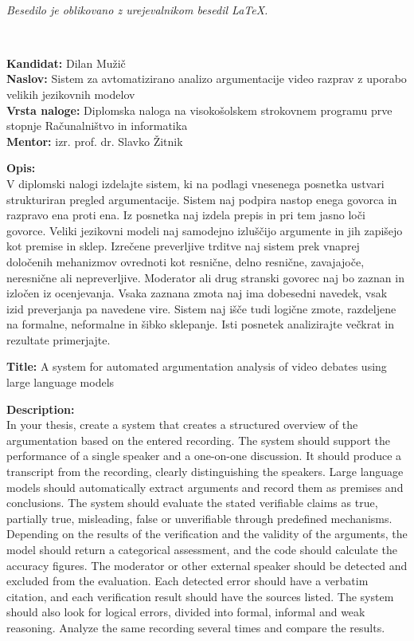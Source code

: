 \documentclass[a4paper, 12pt]{book}
\newcommand{\ttitle}{Sistem za avtomatizirano analizo argumentacije video razprav z uporabo velikih jezikovnih modelov}
\newcommand{\ttitleEn}{A system for automated argumentation analysis of video debates using large language models}
\newcommand{\tauthor}{Dilan Mužič}
\newcommand{\tmentor}{izr. prof. dr. Slavko Žitnik}
\newcommand{\clearemptydoublepage}{\newpage{\pagestyle{empty}\cleardoublepage}}
\begin{document}
\vfill
\begin{center}
  \ \\ \vfill
  {\em
  Besedilo je oblikovano z urejevalnikom besedil \LaTeX.}
\end{center}

\clearemptydoublepage

\thispagestyle{empty}
\
\vfill

\bigskip
\noindent\textbf{Kandidat:} \tauthor\\
\noindent\textbf{Naslov:} \ttitle\\
\noindent\textbf{Vrsta naloge:} Diplomska naloga na visokošolskem strokovnem programu prve stopnje Računalništvo in informatika \\
\noindent\textbf{Mentor:} \tmentor

\bigskip
\noindent\textbf{Opis:}\\
\hspace{1em}V diplomski nalogi izdelajte sistem, ki na podlagi vnesenega posnetka ustvari strukturiran pregled argumentacije. Sistem naj podpira nastop enega govorca in razpravo ena proti ena. Iz posnetka naj izdela prepis in pri tem jasno loči govorce. Veliki jezikovni modeli naj samodejno izluščijo argumente in jih zapišejo kot premise in sklep. Izrečene preverljive trditve naj sistem prek vnaprej določenih mehanizmov ovrednoti kot resnične, delno
resnične, zavajajoče, neresnične ali nepreverljive. Moderator ali drug stranski govorec naj bo zaznan in izločen iz ocenjevanja. Vsaka zaznana zmota naj ima dobesedni navedek, vsak izid preverjanja pa navedene vire. Sistem naj išče tudi logične zmote, razdeljene na formalne, neformalne in šibko sklepanje. Isti posnetek analizirajte večkrat in rezultate primerjajte.

\bigskip
\noindent\textbf{Title:} \ttitleEn

\bigskip
\noindent\textbf{Description:}\\
In your thesis, create a system that creates a structured overview of the argumentation based on the entered recording. The system should support the performance of a single speaker and a one-on-one discussion. It should produce a transcript from the recording, clearly distinguishing the speakers. Large language models should automatically extract arguments and record them as premises and conclusions. The system should evaluate the stated verifiable claims as true, partially true, misleading, false or unverifiable through predefined mechanisms. Depending on the results of the verification and the validity of the arguments, the model should return a categorical assessment, and the code should calculate the accuracy figures. The moderator or other external speaker should be detected and excluded from the evaluation. Each detected error should have a verbatim citation, and each verification result should have the sources listed. The system should also look for logical errors, divided into formal, informal and weak reasoning. Analyze the same recording several times and compare the results.
\end{document}
